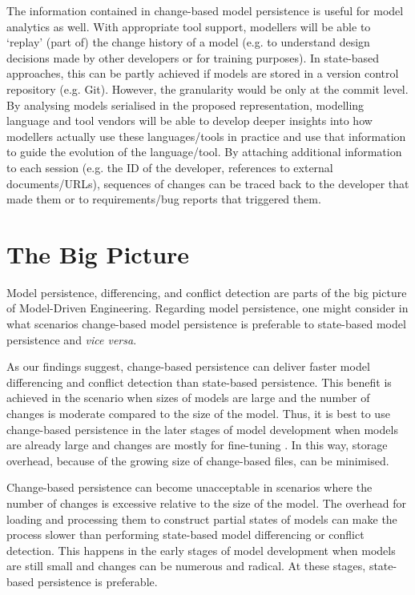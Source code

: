 The information contained in change-based model persistence is useful for model analytics as well. With appropriate tool support, modellers will be able to ‘replay’ (part of) the change history of a model (e.g. to understand design decisions made by other developers or for training purposes). In state-based approaches, this can be partly achieved if models are stored in a version control repository (e.g. Git). However, the granularity would be only at the commit level. By analysing models serialised in the proposed representation, modelling language and tool vendors will be able to develop deeper insights into how modellers actually use these languages/tools in practice and use that information to guide the evolution of the language/tool. By attaching additional information to each session (e.g. the ID of the developer, references to external documents/URLs), sequences of changes can be traced back to the developer that made them or to requirements/bug reports that triggered them.

\section{The Big Picture}
\label{sec:the_big_picture}

Model persistence, differencing, and conflict detection are parts of the big picture of Model-Driven Engineering. Regarding model persistence, one might consider in what scenarios change-based model persistence is preferable to state-based model persistence and \emph{vice versa}.

As our findings suggest, change-based persistence can deliver faster model differencing and conflict detection than state-based persistence. This benefit is achieved in the scenario when sizes of models are large and the number of changes is moderate compared to the size of the model. Thus, it is best to use change-based persistence in the later stages of model development when models are already large and changes are mostly for fine-tuning \cite{selic2003pragmatics}. In this way, storage overhead, because of the growing size of change-based files, can be minimised.

Change-based persistence can become unacceptable in scenarios where the number of changes is excessive relative to the size of the model. The overhead for loading and processing them to construct partial states of models can make the process slower than performing state-based model differencing or conflict detection. This happens in the early stages of model development when models are still small and changes can be numerous and radical. At these stages, state-based persistence is preferable.

